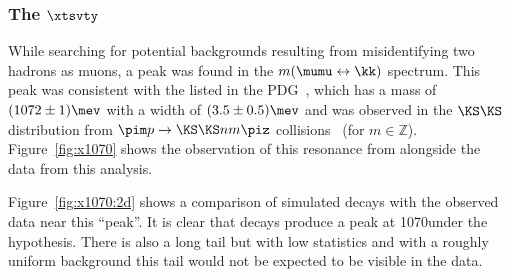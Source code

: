 \subsubsection[The \xtsvty]{The $\boldsymbol{\xtsvty}$}
\label{sec:x1070}

While searching for potential backgrounds resulting from misidentifying two hadrons as muons, a
peak was found in the $m(\mumu\leftrightarrow\kk)$ spectrum.
This peak was consistent with the \xtsvty listed in the PDG~\cite{PDG2012}, which has a mass of
$(1072\pm1)\mev$ with a width of $(3.5\pm0.5)\mev$ and was observed in the $\KS\KS$ distribution
from $\pim p \to \KS \KS n m\piz$ collisions~\cite{x1070vlad} (for $m\in\mathbb{Z}$).
Figure~\ref{fig:x1070} shows the observation of this resonance from  alongside
the data from this analysis.


Figure~\ref{fig:x1070:2d} shows a comparison of simulated \decay{\KS}{\pipi} decays with the observed data near this ``peak''.
It is clear that \decay{\KS}{\pipi} decays produce a peak at 1070\mev under the \kk hypothesis.  There is also a long tail but with low statistics and with a roughly uniform background this tail would not be expected to be visible in the data.

